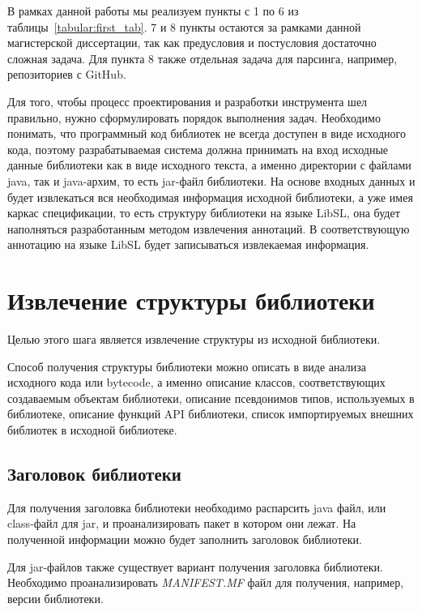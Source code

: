 В рамках данной работы мы реализуем пункты с 1 по 6 из таблицы~\ref{tabular:first_tab}.
7 и 8 пункты остаются за рамками данной магистерской диссертации, так как предусловия и постусловия достаточно сложная задача.
Для пункта 8 также отдельная задача для парсинга, например, репозиториев с GitHub.

Для того, чтобы процесс проектирования и разработки инструмента шел правильно, нужно сформулировать порядок выполнения задач.
Необходимо понимать, что программный код библиотек не всегда доступен в виде исходного кода, поэтому разрабатываемая система должна принимать на вход исходные данные библиотеки как в виде исходного текста, а именно директории с файлами java, так и java-архим, то есть jar-файл библиотеки.
На основе входных данных и будет извлекаться вся необходимая информация исходной библиотеки, а уже имея каркас спецификации, то есть структуру библиотеки на языке LibSL, она будет наполняться разработанным методом извлечения аннотаций.
В соответствующую аннотацию на языке LibSL будет записываться извлекаемая информация.

\section{Извлечение структуры библиотеки}

Целью этого шага является извлечение структуры из исходной библиотеки.

Способ получения структуры библиотеки можно описать в виде анализа исходного кода или bytecode, а именно описание классов, соответствующих создаваемым объектам библиотеки, описание псевдонимов типов, используемых в библиотеке, описание функций API библиотеки, список импортируемых внешних библиотек в исходной библиотеке.

\subsection{Заголовок библиотеки}

Для получения заголовка библиотеки необходимо распарсить java файл, или class-файл для jar, и проанализировать пакет в котором они лежат.
На полученной информации можно будет заполнить заголовок библиотеки.

Для jar-файлов также существует вариант получения заголовка библиотеки. Необходимо проанализировать \textit{MANIFEST.MF} файл для получения, например, версии библиотеки.

